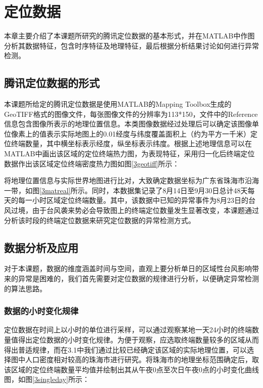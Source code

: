 \documentclass[a4paper,AutoFakeBold,oneside,12pt]{book}
\begin{document}
\chapter{定位数据}
	本章主要介绍了本课题所研究的腾讯定位数据的基本形式，并在MATLAB中作图分析其数据特征，包含时序特征及地理特征，最后根据分析结果讨论如何进行异常检测。


\section{腾讯定位数据的形式}
	本课题所给定的腾讯定位数据是使用MATLAB的Mapping Toolbox生成的GeoTIFF格式的图像文件，每张图像文件的分辨率为113*150，文件中的Reference信息包含图像所表示的地理位置信息。本类图像数据经过处理后可以确定该图像单位像素上的值表示实际地图上的0.01经度与纬度覆盖面积上（约为平方一千米）定位终端数量，其中横坐标表示经度，纵坐标表示纬度。根据上述地理信息可以在MATLAB中画出该区域的定位终端热力图，为表现特征，采用归一化后终端定位数据作出该区域定位终端密度热力图如图\ref{3geotiff}所示：

	将地理位置信息与实际世界地图进行比对，大致确定数据坐标为广东省珠海市沿海一带，如图\ref{3matreal}所示。同时，本数据集记录了8月14日至9月30日总计48天每天的每一小时区域定位终端数量。其中，该数据中已知的异常事件为8月23日的台风过境，由于台风袭来势必会导致图上的终端定位数量发生显著改变，本课题通过分析该时段的终端定位数据来研究定位数据的异常检测方式。

\section{数据分析及应用}
	对于本课题，数据的维度涵盖时间与空间，直观上要分析单日的区域性台风影响带来的异常是困难的，我们首先需要对定位数据的规律进行分析，以便确定异常检测的算法思路。
\subsection{数据的小时变化规律}
	定位数据在时间上以小时的单位进行采样，可以通过观察某地一天24小时的终端数量值得出定位数据的小时变化规律。为便于观察，应选取终端数量较多的区域从而得出普适规律，而在3.1中我们通过比较已经确定该区域的实际地理位置，可以选择图中人口密度相对较高的珠海市进行研究。将珠海市的地理坐标范围确定后，取该区域的定位终端数量平均值并绘制出其从午夜0点至次日午夜0点的小时变化曲线图，如图\ref{3singleday}所示：
\end{document}
